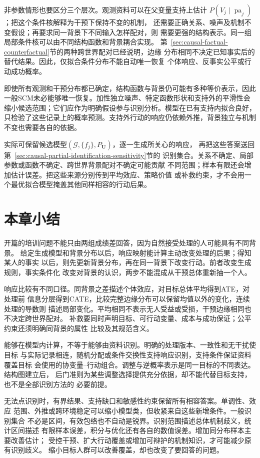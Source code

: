 非参数情形也要区分三个层次。观测资料可以在父变量支持上估计
\(P(V_j\mid\operatorname{pa}_j)\)；把这个条件核解释为干预下保持不变的机制，
还需要正确关系、噪声及机制不变假设；再要求同一背景下不同输入怎样配对，则
需要更强的结构表示。同一组局部条件核可以由不同结构函数和背景耦合实现。
第~\ref{sec:causal-factual-counterfactual}节的两种跨世界配对已经说明，边缘
分布相同不决定已知事实后的替代结果。因此，仅拟合条件分布不能自动唯一恢复
个体响应、反事实公平或行动成功概率。

即使所有观测和干预分布都已确定，结构函数与背景仍可能有多种等价表示，因此一般SCM未必能够唯一恢复。加性独立噪声、特定函数形状和支持外的平滑性会缩小候选范围；它们应作为明确假设参与识别分析。模型在已有支持内拟合良好，只检验了这些记录上的概率预测。支持外行动的响应仍依赖外推，背景独立与机制不变也需要各自的依据。

实际可保留候选模型\((\mathcal G,\{f_j\},P_{\bm U})\)，逐一生成所关心的响应，
再把这些答案送回第~\ref{sec:causal-partial-identification-sensitivity}节的
识别集合。关系不确定、局部参数或函数不确定、跨世界背景配对不确定可能贡献
不同范围；样本有限还会增加估计误差。把这些来源分别传到平均效应、策略价值
或补救约束，才不会用一个最优拟合模型掩盖其他同样相容的行动后果。

\section{本章小结}
\label{sec:causal-inference-summary}

开篇的培训问题不能只由两组成绩差回答，因为自然接受处理的人可能具有不同背景。
给定生成模型和背景分布以后，响应映射能计算主动改变处理的后果；得知某人的事实
以后，则先更新背景分布，再在同一背景下改变行动。前者改变生成规则，事实条件化
改变对背景的认识，两步不能混成从干预总体重新抽一个人。

响应比较有不同口径。同背景之差描述个体效应，对目标总体平均得到ATE，对处理前
信息分层得到CATE，比较完整边缘分布可以保留均值以外的变化，连续处理的导数则
描述局部变化。平均相同不表示无人受益或受损，干预边缘相同也不决定跨世界配对。
补救要同时声明目标、可行动变量、成本与成功保证；公平约束还须明确同背景的属性
比较及其规范含义。

能够在模型内计算，不等于能够由资料识别。明确的处理版本、一致性和无干扰使目标
与实际记录相连，随机分配或条件交换性支持响应识别，支持条件保证资料覆盖目标
会使用的协变量--行动组合。调整与逆概率表示是同一目标的不同表达。结构图建立后，
后门准则为某些调整选择提供充分依据，却不能代替目标支持，也不是全部识别方法的
必要前提。

无法点识别时，有界结果、支持缺口和敏感性约束保留所有相容答案。单调性、效应
范围、外推或跨环境稳定可以缩小模型类，但收紧来自这些新增条件。一般识别集合
不必是区间，有效包络也不自动是锐界。识别范围描述总体机制歧义，统计区间描述
有限样本误差，积分与优化还有各自的数值误差。增加同分布样本主要改善估计；
受控干预、扩大行动覆盖或增加可辩护的机制知识，才可能减少原有识别歧义。
缩小目标人群可以改善覆盖，却也改变了要回答的问题。

